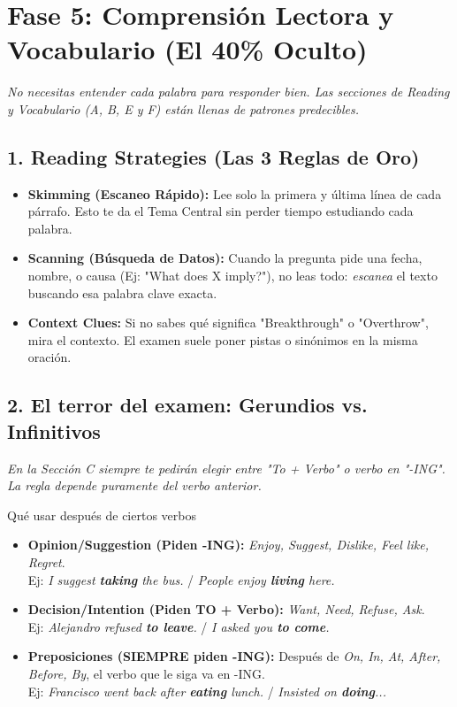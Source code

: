 \documentclass[11pt,a4paper]{article}
\begin{document}
\vspace{0.4cm}

\section{Fase 5: Comprensión Lectora y Vocabulario (El 40\% Oculto)}
\textit{No necesitas entender cada palabra para responder bien. Las secciones de Reading y Vocabulario (A, B, E y F) están llenas de patrones predecibles.}

\subsection{1. Reading Strategies (Las 3 Reglas de Oro)}
\begin{itemize}[noitemsep]
    \item \textbf{Skimming (Escaneo Rápido):} Lee solo la primera y última línea de cada párrafo. Esto te da el Tema Central sin perder tiempo estudiando cada palabra.
    \item \textbf{Scanning (Búsqueda de Datos):} Cuando la pregunta pide una fecha, nombre, o causa (Ej: "What does X imply?"), no leas todo: \textit{escanea} el texto buscando esa palabra clave exacta.
    \item \textbf{Context Clues:} Si no sabes qué significa "Breakthrough" o "Overthrow", mira el contexto. El examen suele poner pistas o sinónimos en la misma oración.
\end{itemize}

\subsection{2. El terror del examen: Gerundios vs. Infinitivos}
\textit{En la Sección C siempre te pedirán elegir entre "To + Verbo" o verbo en "-ING". La regla depende puramente del verbo anterior.}
\begin{hackbox}{Qué usar después de ciertos verbos}
    \begin{itemize}[noitemsep]
        \item \textbf{Opinion/Suggestion (Piden -ING):} \textit{Enjoy, Suggest, Dislike, Feel like, Regret}. \\ 
        Ej: \textit{I suggest \textbf{taking} the bus.} / \textit{People enjoy \textbf{living} here.}
        \item \textbf{Decision/Intention (Piden TO + Verbo):} \textit{Want, Need, Refuse, Ask}. \\
        Ej: \textit{Alejandro refused \textbf{to leave}.} / \textit{I asked you \textbf{to come}.}
        \item \textbf{Preposiciones (SIEMPRE piden -ING):} Después de \textit{On, In, At, After, Before, By}, el verbo que le siga va en -ING. \\
        Ej: \textit{Francisco went back after \textbf{eating} lunch.} / \textit{Insisted on \textbf{doing}...}
    \end{itemize}
\end{hackbox}
\end{document}
